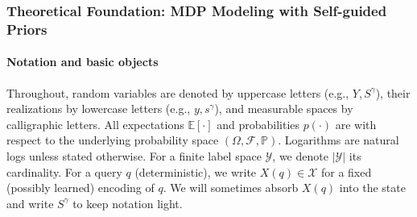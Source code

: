 \documentclass[preprint,12pt]{elsarticle}
\begin{document}


\subsubsection{Theoretical Foundation: MDP Modeling with Self-guided Priors}

\paragraph{Notation and basic objects}
Throughout, random variables are denoted by uppercase letters (e.g., $Y,S^\gamma$),
their realizations by lowercase letters (e.g., $y,s^\gamma$), and measurable spaces by calligraphic letters.
All expectations $\mathbb{E}[\cdot]$ and probabilities $p(\cdot)$ are with respect to the underlying probability space
$(\Omega,\mathcal{F},\mathbb{P})$. Logarithms are natural logs unless stated otherwise.
For a finite label space $\mathcal{Y}$, we denote $|\mathcal{Y}|$ its cardinality.
For a query $q$ (deterministic), we write $X(q)\in\mathcal{X}$ for a fixed (possibly learned) encoding of $q$.
We will sometimes absorb $X(q)$ into the state and write $S^\gamma$ to keep notation light.
\end{document}
